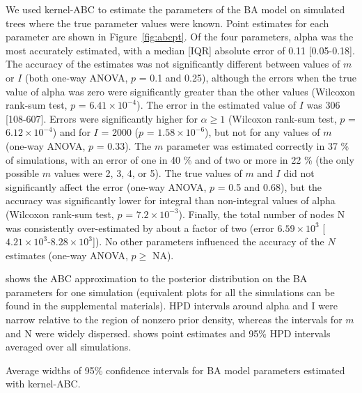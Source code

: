 We used kernel-\gls{ABC} to estimate the parameters of the \gls{BA} model 
on simulated trees where the true parameter values were known. Point estimates
for each parameter are shown in Figure~\ref{fig:abcpt}. Of the four parameters,
\gls{alpha} was the most accurately estimated, with a median [IQR] absolute error
of 
    0.11 
    [0.05-0.18].
The accuracy of the estimates was not significantly different between values of
$m$ or $I$ (both one-way ANOVA,
    $p$ = 0.1
and 
    0.25),
although the errors when the true value of \gls{alpha} was zero were
significantly greater than the other values 
    (Wilcoxon rank-sum test, $p$ = \ensuremath{6.41\times 10^{-4}}).
The error in the estimated value of $I$ was
    306 
    [108-607].
Errors were significantly higher for $\alpha \geq 1$
    (Wilcoxon rank-sum test, $p$ = \ensuremath{6.12\times 10^{-4}})
and for $I$ = 2000
    ($p$ = \ensuremath{1.58\times 10^{-6}}),
but not for any values of $m$
    (one-way ANOVA, $p$ = 0.33).
The $m$ parameter was estimated correctly in
    37 \%
of simulations, with an error of one in
    40 \%
and of two or more in 
    22 \%
(the only possible $m$ values were 2, 3, 4, or 5). The true values of
$m$ and $I$ did not significantly affect the error
    (one-way ANOVA, $p$ = 0.5 and
                          0.68),
but the accuracy was significantly lower for integral than non-integral
values of \gls{alpha}
    (Wilcoxon rank-sum test, $p$ = \ensuremath{7.2\times 10^{-3}}).
Finally, the total number of nodes \gls{N} was consistently over-estimated by
about a factor of two
    (error \ensuremath{6.59\times 10^{3}} 
    [\ensuremath{4.21\times 10^{3}}-\ensuremath{8.28\times 10^{3}}]).
No other parameters influenced the accuracy of the $N$ estimates 
    (one-way ANOVA, $p \geq$ NA).

 shows the \gls{ABC} approximation to the posterior
distribution on the \gls{BA} parameters for one simulation (equivalent plots
for all the simulations can be found in the supplemental materials). \Gls{HPD}
intervals around \gls{alpha} and \gls{I} were narrow relative to the region of
nonzero prior density, whereas the intervals for $m$ and \gls{N} were widely
dispersed.  shows point estimates and 95\% \gls{HPD}
intervals averaged over all simulations.

\begin{table}
    \centering
    
    \caption{Average widths of 95\% confidence intervals for \gls{BA} model
    parameters estimated with kernel-\gls{ABC}.}
    \label{tab:glm}
\end{table}

